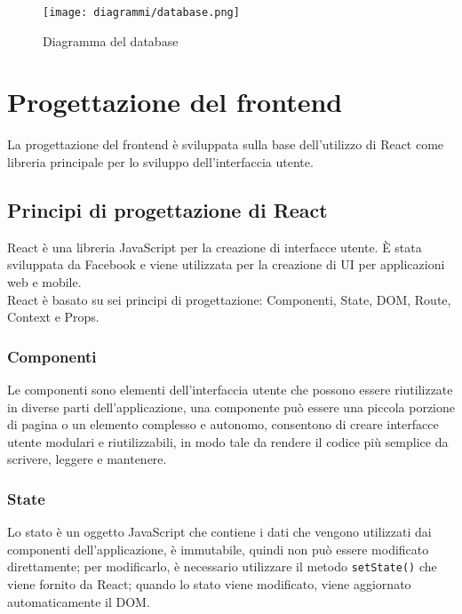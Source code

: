 \begin{figure}[H] 
    \centering 
    \texttt{[image: diagrammi/database.png]} 
    \caption{Diagramma del database}
\end{figure}

\section{Progettazione del frontend}
La progettazione del frontend è sviluppata sulla base dell'utilizzo di React come libreria principale per lo sviluppo dell'interfaccia utente.
\subsection{Principi di progettazione di React}
React è una libreria JavaScript per la creazione di interfacce utente. È stata sviluppata da Facebook e viene utilizzata per la creazione di UI per applicazioni web e mobile.\\
React è basato su sei principi di progettazione: Componenti, State, DOM, Route, Context e Props.\\
\subsubsection{Componenti}
Le componenti sono elementi dell'interfaccia utente che possono essere riutilizzate in diverse parti dell'applicazione, una componente può essere una piccola porzione di pagina o un elemento complesso e autonomo, consentono di creare interfacce utente modulari e riutilizzabili, in modo tale da rendere il codice più semplice da scrivere, leggere e mantenere.\\
\subsubsection{State}
Lo stato è un oggetto JavaScript che contiene i dati che vengono utilizzati dai componenti dell'applicazione, è immutabile, quindi non può essere modificato direttamente; per modificarlo, è necessario utilizzare il metodo \texttt{setState()} che viene fornito da React; quando lo stato viene modificato, viene aggiornato automaticamente il DOM.\\
